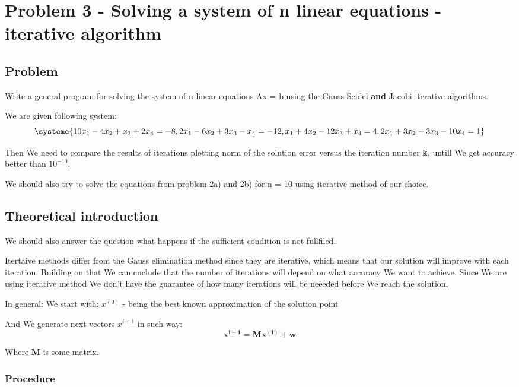 \documentclass{report}
\begin{document}
\chapter{Problem 3 - Solving a system of n linear equations - iterative algorithm}

\section{Problem}
Write a general program for solving the system of n linear equations Ax = b using the Gauss-Seidel \textbf{and} Jacobi iterative algorithms.

We are given following system:
\[
\systeme{10x_1-4x_2+x_3+2x_4=-8, 2x_1-6x_2+3x_3-x_4=-12, x_1+4x_2-12x_3+x_4=4, 2x_1+3x_2-3x_3-10x_4=1}
\]

Then We need to compare the results of iterations plotting norm of the solution error versus the iteration number \textbf{k}, untill We get accuracy better than $10^{-10}$.

We should also try to solve the equations from problem 2a) and 2b) for n = 10 using iterative method of our choice.


\section{Theoretical introduction}

 We should also answer the question what happens if the sufficient condition is not fullfiled.

Itertaive methods differ from the Gauss elimination method since they are iterative, which means that our solution will improve with each iteration. Building on that We can cnclude that the number of iterations will depend on what accuracy We want to achieve. Since We are using iterative method We don't have the guarantee of how many iterations will be neeeded before We reach the solution,

In general:
We start with:
 \textbf{$x^{(0)}$ } - being the best known approximation of the solution point

And We generate next vectors  \textbf{$x^{i+1}$}  in such way:
\[ \mathbf{x^{i+1}} = \mathbf{M}\mathbf{x^{(i)}} + \mathbf{w} \]

Where $\mathbf{M}$ is some matrix.

\subsection{Procedure}
\end{document}
